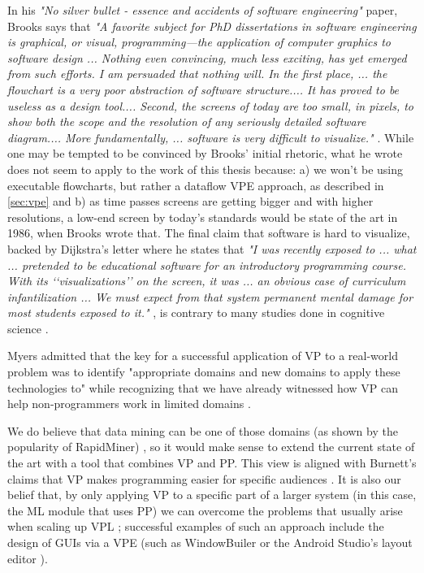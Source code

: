 In his \textit{"No silver bullet - essence and accidents of software engineering"} paper, Brooks
says that \textit{"A favorite subject for PhD dissertations in software engineering is graphical, or visual,
programming—the application of computer graphics to software design ...
Nothing even convincing, much less exciting, has yet emerged from such efforts. I am persuaded that nothing will. In
the first place, ... the flowchart is a very poor abstraction of software structure....
It has proved to be useless as a design tool.... Second, the screens of today are too small, in pixels, to show both
the scope and the resolution of any seriously detailed software diagram.... More fundamentally, ...
software is very difficult to visualize."} \cite{Brooks1986}. While one may be tempted
to be convinced by Brooks' initial rhetoric, what he wrote does not seem to apply
to the work of this thesis because: a) we won't be using executable flowcharts,
but rather a dataflow VPE approach, as described in \ref{sec:vpe} and b) as time passes screens
are getting bigger and with higher resolutions, a low-end screen by today's standards
would be state of the art in 1986, when Brooks wrote that. The final claim that
software is hard to visualize, backed by Dijkstra's letter where he states that
\textit{"I was recently exposed to ... what ... pretended to be educational software for an introductory programming course.
With its ‘‘visualizations’’ on the screen, it was ... an obvious case of curriculum
infantilization ... We must expect from that system permanent mental damage for most students
exposed to it."} \cite{dijkstra1989cruelty}, is contrary to many studies done in cognitive science
\cite{Lewis1987}\cite{cunniff1986does}\cite{Carlisle2005}.

Myers admitted that the key for a successful application of VP to a real-world
problem was to identify "appropriate domains and new domains to apply these
technologies to" while recognizing that we have already witnessed how VP can help
non-programmers work in limited domains \cite{Myers1990}.

We do believe that
data mining can be one of those domains (as shown by the popularity of RapidMiner) \cite{kdn},
so it would make sense to extend the current state of the art with a tool that
combines VP and PP. This view is aligned with Burnett's claims that VP makes
programming easier for specific audiences \cite{Burnett1999}. It is also our belief
that, by only applying VP to a specific part of a larger system (in this case,
the ML module that uses PP) we can overcome the problems that usually arise when
scaling up VPL \cite{Burnett1995}; successful examples of such an approach
include the design of GUIs via a VPE (such as WindowBuiler \cite{winbuild} or
the Android Studio's layout editor \cite{layouted}).

